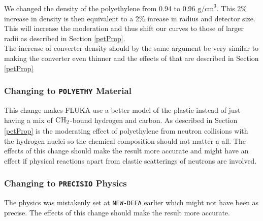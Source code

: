 \documentclass[a4paper,10pt]{article}
\newcommand{\nucl}[3]{
\ensuremath{
\phantom{\ensuremath{^{#1}_{#2}}}
\llap{\ensuremath{^{#1}}}
\llap{\ensuremath{_{\rule{0pt}{.75em}#2}}}
\mbox{#3}
}
}
\begin{document}
We changed the density of the polyethylene from 0.94 to 0.96 $\mathrm{g/cm}^3$. This 2\% increase in density is then equivalent to a 2\% inrease in radius and detector size. This will increase the moderation and thus shift our curves to those of larger radii as described in Section \ref{petProp}.\\
The increase of converter density should by the same argument be very similar to making the converter even thinner and the effects of that are described in Section \ref{petProp} 
\subsubsection{Changing to \texttt{POLYETHY} Material}
This change makes FLUKA use a better model of the plastic instead of just having a mix of $\nucl{}{}{C}\nucl{}{}{H}_2$-bound hydrogen and carbon. As described in Section \ref{petProp} is the moderating effect of polyethylene from neutron collisions with the hydrogen nuclei so the chemical composition should not matter a all. The effects of this change should make the result more accurate and might have an effect if physical reactions apart from elastic scatterings of neutrons are involved.
\subsubsection{Changing to \texttt{PRECISIO} Physics}
The physics was mistakenly set at \verb!NEW-DEFA! earlier which might not have been as precise. The effects of this change should make the result more accurate.


\end{document}

